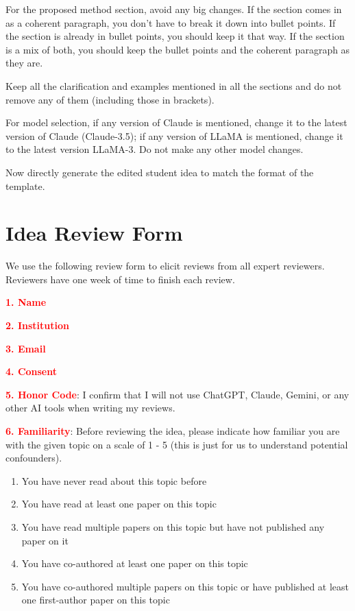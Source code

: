 \begin{tcolorbox}[colframe=green!50!black, colback=green!10!white, title=Style Standardization Prompt]
For the proposed method section, avoid any big changes. If the section comes in as a coherent paragraph, you don't have to break it down into bullet points. If the section is already in bullet points, you should keep it that way. If the section is a mix of both, you should keep the bullet points and the coherent paragraph as they are.

Keep all the clarification and examples mentioned in all the sections and do not remove any of them (including those in brackets).

For model selection, if any version of Claude is mentioned, change it to the latest version of Claude (Claude-3.5); if any version of LLaMA is mentioned, change it to the latest version LLaMA-3. Do not make any other model changes.

Now directly generate the edited student idea to match the format of the template.
\end{tcolorbox}


\newpage 








\section{Idea Review Form}
\label{sec:review_form}

We use the following review form to elicit reviews from all expert reviewers. Reviewers have one week of time to finish each review. 

\textbf{\textcolor{red}{1. Name}} 

\textbf{\textcolor{red}{2. Institution}} 

\textbf{\textcolor{red}{3. Email}} 

\textbf{\textcolor{red}{4. Consent}} 

\textbf{\textcolor{red}{5. Honor Code}}: I confirm that I will not use ChatGPT, Claude, Gemini, or any other AI tools when writing my reviews. 

\textbf{\textcolor{red}{6. Familiarity}}: Before reviewing the idea, please indicate how familiar you are with the given topic on a scale of 1 - 5 (this is just for us to understand potential confounders). 

\begin{enumerate}
    \item You have never read about this topic before
    \item You have read at least one paper on this topic
    \item You have read multiple papers on this topic but have not published any paper on it
    \item You have co-authored at least one paper on this topic
    \item You have co-authored multiple papers on this topic or have published at least one first-author paper on this topic
\end{enumerate}

